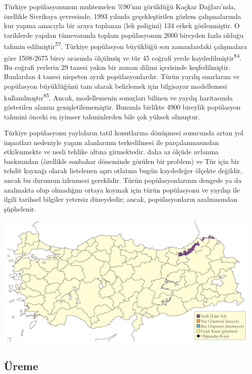 \documentclass[
  letterpaper,
  DIV=11,
  numbers=noendperiod]{scrreprt}
\begin{document}
Türkiye popülasyonunun muhtemelen \%90'nın görüldüğü Kaçkar Dağları'nda,
özellikle Sivrikaya çevresinde, 1993 yılında geçekleştirilen gözlem
çalışmalarında kur yapma amacıyla bir araya toplanan (lek poligini) 134
erkek gözlenmiştir. O tarihlerde yapılan tümevarımla toplam popülasyonun
2000 bireyden fazla olduğu tahmin edilmiştir\textsuperscript{57}.
Türkiye popülasyon büyüklüğü son zamanlardaki çalışmalara göre 1508-2675
birey arasında ölçülmüş ve tür 45 coğrafi yerde
kaydedilmiştir\textsuperscript{84}. Bu coğrafi yerlerin 29 tanesi yakın
bir zaman dilimi içerisinde keşfedilmiştir. Bunlardan 4 tanesi nispeten
ayrık popülasyonlardır. Türün yayılış sınırlarını ve popülasyon
büyüklüğünü tam olarak belirlemek için bilgisayar modellemesi
kullanılmıştır\textsuperscript{85}. Ancak, modellemenin sonuçları
bilinen ve yayılış haritasında gösterilen alanını genişletilememiştir.
Bununla birlikte 4900 bireylik popülasyon tahmini önceki en iyimser
tahminlerden bile çok yüksek olmuştur.

Türkiye popülasyonu yaylaların tatil konutlarına dönüşmesi sonucunda
artan yol inşaatları nedeniyle yaşam alanlarının terkedilmesi ile
parçalanmasından etkilenmekte ve nesli tehlike altına girmektedir. daha
az ölçüde avlanma baskısından (özellikle sonbahar döneminde görülen bir
problem) ve Tür için bir tehdit kaynağı olarak listelenen aşırı otlatma
bugün kaydedeğer ölçekte değildir, ancak bu durumun izlenmesi
gereklidir. Türün popülasyonlarının dengede ya da azalmakta olup
olmadığını ortaya koymak için türün popülasyonu ve yayılışı ile ilgili
tarihsel bilgiler yetersiz düzeydedir; ancak, popülasyonların
azalmasından şüphelenir.

\includegraphics{images/harita_Page_037.png}

\subsection{\texorpdfstring{\textbf{Üreme}}{Üreme}}\label{uxfcreme-1}
\end{document}
